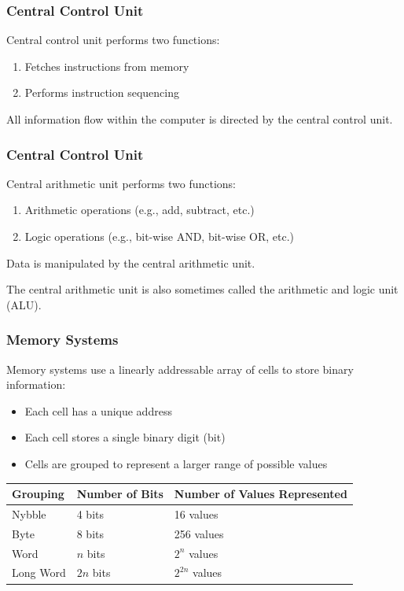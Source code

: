 \begin{frame}
\frametitle{Central Control Unit}
Central control unit performs two functions:
\begin{enumerate}
\item Fetches instructions from memory
\item Performs instruction sequencing
\end{enumerate}

All information flow within the computer is directed by the central control unit.

\end{frame}

\begin{frame}
\frametitle{Central Control Unit}

Central arithmetic unit performs two functions:

\begin{enumerate}
\item Arithmetic operations (e.g., add, subtract, etc.)
\item Logic operations (e.g., bit-wise AND, bit-wise OR, etc.)
\end{enumerate}

Data is manipulated by the central arithmetic unit.

The central arithmetic unit is also sometimes called the \alert{arithmetic and logic unit (ALU)}.

\end{frame}

\begin{frame}
\frametitle{Memory Systems}

Memory systems use a linearly addressable array of cells to store binary information:
\begin{itemize}
	\item Each cell has a unique address
	\item Each cell stores a single binary digit (bit)
	\item  Cells are grouped to represent a larger range of possible values
\end{itemize}

\begin{center}
\begin{tabular}{l l l}
	\textbf{Grouping} & \textbf{Number of Bits} & \textbf{Number of Values Represented} \\ \hline
	Nybble & 4 bits & 16 values \\
	Byte   & 8 bits & 256 values \\
	Word   & $n$ bits & $2^{n}$ values \\
	Long Word & $2n$ bits & $2^{2n}$ values\\
\end{tabular}
\end{center}

\end{frame}

